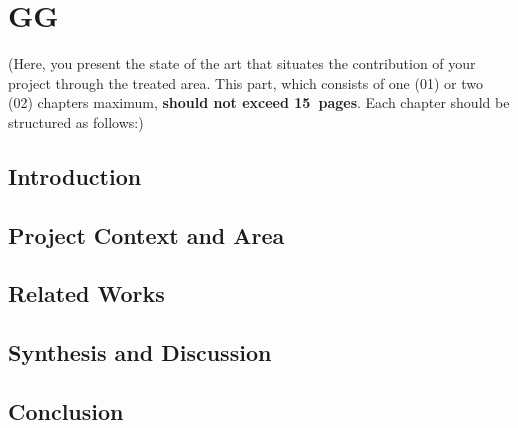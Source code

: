 \chapter{GG} \label{chap:state_of_the_art}

(Here, you present the state of the art that situates the contribution of your project through the treated area. This part, which consists of one (01) or two (02) chapters maximum, \textbf{should not exceed 15~pages}. Each chapter should be structured as follows:)

\section*{Introduction}
\section{Project Context and Area}
\section{Related Works}
\section{Synthesis and Discussion}
\section*{Conclusion}
